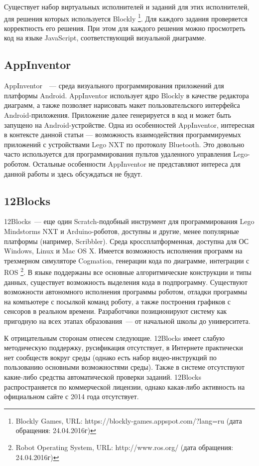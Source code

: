 \documentclass[a5paper]{article}
\begin{document}
Существует набор виртуальных исполнителей и заданий для этих исполнителей, для решения которых используется Blockly%
\footnote{Blockly Games, URL: https://blockly-games.appspot.com/?lang=ru (дата обращения: 24.04.2016г)}. 
Для каждого задания проверяется корректность его решения. При этом для каждого решения можно просмотреть код 
на языке JavaScript, соответствующий визуальной диаграмме.

\subsection{AppInventor}

AppInventor~\cite{wolber2011app}~--- среда визуального программирования приложений для платформы Android. 
AppInventor использует ядро Blockly в качестве редактора диаграмм, а также позволяет 
нарисовать макет пользовательского интерфейса 
Android-приложения. Приложение далее генерируется в код и может быть запущено на Android-устройстве. Одна 
из особенностей AppInventor, интересная в контексте данной статьи --- возможность взаимодействия программируемых 
приложений с устройствами Lego NXT по протоколу Bluetooth. Это довольно часто используется для программирования 
пультов удаленного управления Lego-роботом. Остальные особенности AppInventor не представляют интереса для данной 
работы и здесь обсуждаться не будут.

\subsection{12Blocks}

12Blocks~--- еще один Scratch-подобный инструмент для программирования Lego Mindstorms NXT и Arduino-роботов, 
доступны и другие, менее популярные платформы (например, Scribbler). Среда кроссплатформенная, доступна для 
ОС Windows, Linux и Mac OS X. Имеется возможность исполнения программ на трехмерном симуляторе Cogmation, 
генерации кода по диаграмме, интеграции с ROS%
\footnote{Robot Operating System, URL: http://www.ros.org/ (дата обращения: 24.04.2016г)}. 
В языке поддержаны все основные алгоритмические конструкции и 
типы данных, существует возможность выделения кода в подпрограмму. Существуют возможности автономного исполнения 
программы роботом, отладки программы на компьютере с посылкой команд роботу, а также построения графиков с 
сенсоров в реальном времени. Разработчики позиционируют систему как пригодную на всех этапах образования~--- от 
начальной школы до университета.

К отрицательным сторонам отнесем следующие.  12Blocks имеет слабую методическую поддержку, русификация 
отсутствует, в Интернете практически нет сообществ вокруг среды (однако есть набор видео-инструкций по пользованию 
основными возможностями среды). Также в системе отсутствуют какие-либо средства автоматической проверки заданий. 
12Blocks распространяется по коммерческой лицензии, однако какая-либо активность на официальном сайте 
с 2014 года отсутствует.
\end{document}

